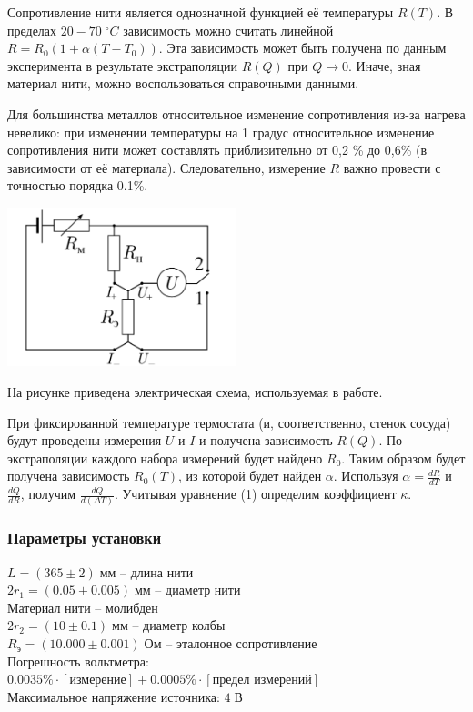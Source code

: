 \documentclass[12pt,a4paper]{article}
\begin{document}
	Сопротивление нити является однозначной функцией её температуры $R(T)$.
	В пределах $20-70 \; ^{\circ} C$ зависимость можно считать линейной $R = R_0 (1 + \alpha(T - T_0))$.
	Эта зависимость может быть получена по данным эксперимента в результате экстраполяции $R(Q)$ при $Q\rightarrow 0$. Иначе, зная материал нити, можно воспользоваться справочными данными.
	
	Для большинства металлов относительное изменение сопротивления из-за нагрева невелико: при изменении температуры на 1 градус относительное изменение сопротивления нити может составлять приблизительно от 0,2 \% до 0,6\% (в зависимости от её материала).
	Следовательно, измерение $R$ важно провести с точностью порядка 0.1\%.
	
	\begin{center}
		\includegraphics[width=0.5\textwidth]{elec.png}
	\end{center}
	
	На рисунке приведена электрическая схема, используемая в работе.
	
	При фиксированной температуре термостата (и, соответственно, стенок сосуда) будут проведены измерения $U$ и $I$ и получена зависимость $R(Q)$.
	По экстраполяции каждого набора измерений будет найдено $R_0$.
	Таким образом будет получена зависимость $R_0(T)$, из которой будет найден $\alpha$.
	Используя $\alpha = \frac{dR}{dT}$ и $\frac{dQ}{dR}$, получим $\frac{dQ}{d(\Delta T)}$.
	Учитывая уравнение (1) определим коэффициент $\kappa$.
	
	\subsubsection*{Параметры установки}
		$L = (365 \pm 2) \; \text{мм}$ -- длина нити \\
		$2 r_1 = (0.05 \pm 0.005) \; \text{мм}$ -- диаметр нити \\
		Материал нити -- молибден \\
		$2 r_2 = (10 \pm 0.1) \; \text{мм}$ -- диаметр колбы \\
		$R_{\text{э}} = (10.000 \pm 0.001) \; \text{Ом}$ -- эталонное сопротивление \\
		Погрешность вольтметра: $0.0035\% \cdot [\text{измерение}] + 0.0005\% \cdot [\text{предел измерений}]$ \\
		Максимальное напряжение источника: $4 \; \text{В}$
	
\end{document}
